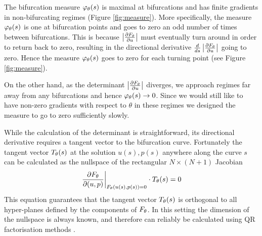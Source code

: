\documentclass{article}
\begin{document}
The bifurcation measure $\varphi_{\theta}(s)$ is maximal at bifurcations and has finite gradients in non-bifurcating regimes (Figure \ref{fig:measure}). More specifically, the measure $\varphi_{\theta}(s)$ is one at bifurcation points and goes to zero an odd number of times between bifurcations. This is because $\left| \frac{\partial F_{\theta}}{\partial u} \right|$ must eventually turn around in order to return back to zero, resulting in the directional derivative $\frac{d}{ds}\left| \frac{\partial F_{\theta}}{\partial u} \right|$ going to zero. Hence the measure $\varphi_{\theta}(s)$ goes to zero for each turning point (see Figure \ref{fig:measure}).

On the other hand, as the determinant $\left| \frac{\partial F_{\theta}}{\partial u} \right|$ diverges, we approach regimes far away from any bifurcations and hence $\varphi_{\theta}(s)\rightarrow0$. Since we would still like to have non-zero gradients with respect to $\theta$ in these regimes we designed the measure to go to zero sufficiently slowly.
\clearpage


While the calculation of the determinant is straightforward, its directional derivative requires a tangent vector to the bifurcation curve. Fortunately the tangent vector $T_{\theta}(s)$ at the solution $u(s),p(s)$ anywhere along the curve $s$ can be calculated as the nullspace of the rectangular $N\times(N+1)$ Jacobian
\begin{equation}
    \left.
    \frac{\partial F_{\theta}}{\partial(u,p)}
    \right|_{F_{\theta}(u(s),p(s))=0}
    \cdot T_{\theta}(s)=0
    \label{eq:tangent}
\end{equation}
This equation guarantees that the tangent vector $T_{\theta}(s)$ is orthogonal to all hyper-planes defined by the components of $F_{\theta}$. In this setting the dimension of the nullspace is always known, and therefore can reliably be calculated using QR factorisation methods \cite{Drmac2008OnStudy}.
\end{document}
